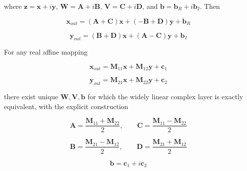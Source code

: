 where \(\mathbf{z}=\mathbf{x}+i\mathbf{y}\), \(\mathbf{W}=\mathbf{A}+i\mathbf{B}\), \(\mathbf{V}=\mathbf{C}+i\mathbf{D}\), and \(\mathbf{b}=\mathbf{b}_{R}+i\mathbf{b}_{I}\). Then

\begin{equation}
\label{eq:chnn-4-9}
\mathbf{x}_{out} = \left( \mathbf{A} + \mathbf{C} \right)\mathbf{x} + \left( - \mathbf{B} + \mathbf{D} \right)\mathbf{y} + \mathbf{b}_{R}
\end{equation}

\begin{equation}
\label{eq:chnn-4-10}
\mathbf{y}_{out} = \left( \mathbf{B} + \mathbf{D} \right)\mathbf{x} + \left( \mathbf{A} - \mathbf{C} \right)\mathbf{y} + \mathbf{b}_{I}
\end{equation}

\begin{proposition}\label{prop:real-affine-completeness}
For any real affine mapping

\begin{equation}
\label{eq:chnn-4-11}
\mathbf{x}_{out} = \mathbf{M}_{11}\mathbf{x} + \mathbf{M}_{12}\mathbf{y} + \mathbf{c}_{1}
\end{equation}

\begin{equation}
\label{eq:chnn-4-12}
\mathbf{y}_{out} = \mathbf{M}_{21}\mathbf{x} + \mathbf{M}_{22}\mathbf{y} + \mathbf{c}_{2}
\end{equation}

there exist unique \(\mathbf{W},\mathbf{V},\mathbf{b}\) for which the widely linear complex layer is exactly equivalent, with the explicit construction

\begin{equation}
\label{eq:chnn-4-13}
\mathbf{A} = \frac{\mathbf{M}_{11} + \mathbf{M}_{22}}{2},\quad\quad\mathbf{C} = \frac{\mathbf{M}_{11} - \mathbf{M}_{22}}{2}
\end{equation}

\begin{equation}
\label{eq:chnn-4-14}
\mathbf{B} = \frac{\mathbf{M}_{21} - \mathbf{M}_{12}}{2},\quad\quad\mathbf{D} = \frac{\mathbf{M}_{21} + \mathbf{M}_{12}}{2}
\end{equation}

\begin{equation}
\label{eq:chnn-4-15}
\mathbf{b} = \mathbf{c}_{1} + i\mathbf{c}_{2}
\end{equation}
\end{proposition}


